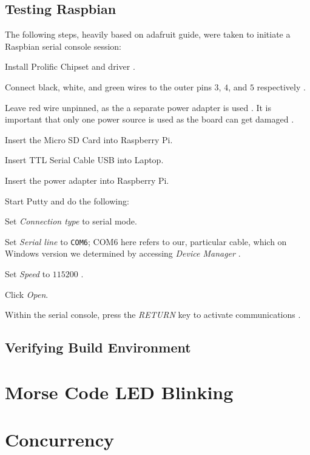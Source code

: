 \documentclass[onecolumn, draftclsnofoot, 10pt]{IEEEtran}
\begin{document}
\subsection{Testing Raspbian}
The following steps, heavily based on adafruit guide, were taken to initiate a Raspbian serial console session:
\begin{description}
\item Install Prolific Chipset and driver \cite{adafruit1}.
\item Connect black, white, and green wires to the outer pins $3$, $4$, and $5$ respectively \cite{adafruit1}.
\item Leave red wire unpinned, as the a separate power adapter is used \cite{adafruit1}. It is important that only one power source is used as the board can get damaged \cite{adafruit1}.
\item Insert the Micro SD Card into Raspberry Pi.
\item Insert TTL Serial Cable USB into Laptop.
\item Insert the power adapter into Raspberry Pi.
\item Start Putty and do the following:
\begin{description}
\item Set \textit{Connection type} to serial mode.
\item Set \textit{Serial line} to \texttt{COM6}; {COM6} here refers to our, particular cable, which on Windows version we determined by accessing \textit{Device Manager} \cite{adafruit1}.
\item Set \textit{Speed} to $115200$ \cite{adafruit1}.
\item Click \textit{Open}.
\end{description}
\item Within the serial console, press the \textit{RETURN} key to activate communications \cite{adafruit1}.
\end{description}


\subsection{Verifying Build Environment}



\section{Morse Code LED Blinking}



\section{Concurrency}


\clearpage
\medskip


\end{document}
